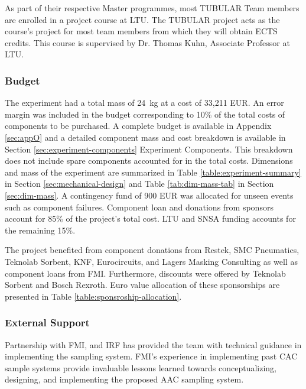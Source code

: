 As part of their respective Master programmes, most TUBULAR Team members are enrolled in a project course at LTU. The TUBULAR project acts as the course's project for most team members from which they will obtain ECTS credits. This course is supervised by Dr. Thomas Kuhn, Associate Professor at LTU.

\pagebreak
\subsubsection{Budget}
\label{sec:3.2.2}
The experiment had a total mass of \SI{24}{\kilo\gram} at a cost of 33,211 EUR. An error margin was included in the budget corresponding to 10\% of the total costs of components to be purchased. A complete budget is available in Appendix \ref{sec:appO} and a detailed component mass and cost breakdown is available in Section \ref{sec:experiment-components} Experiment Components. This breakdown does not include spare components accounted for in the total costs. Dimensions and mass of the experiment are summarized in Table \ref{table:experiment-summary} in Section \ref{sec:mechanical-design} and Table \ref{tab:dim-mass-tab} in Section \ref{sec:dim-mass}. A contingency fund of 900 EUR was allocated for unseen events such as component failures. Component loan and donations from sponsors account for 85\% of the project's total cost. LTU and SNSA funding accounts for the remaining 15\%. 

%

The project benefited from component donations from Restek, SMC Pneumatics, Teknolab Sorbent, KNF, Eurocircuits, and Lagers Masking Consulting as well as component loans from FMI. Furthermore, discounts were offered by Teknolab Sorbent and Bosch Rexroth. Euro value allocation of these sponsorships are presented in Table \ref{table:sponsroship-allocation}.



\pagebreak
\subsubsection{External Support}

Partnership with FMI, and IRF has provided the team with technical guidance in implementing the sampling system. FMI’s experience in implementing past CAC sample systems provide invaluable lessons learned towards conceptualizing, designing, and implementing the proposed AAC sampling system.

